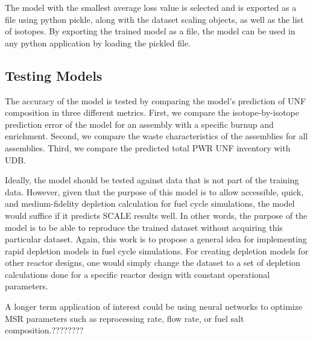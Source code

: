 The model with the smallest average loss value
is selected and is exported as a file using python
pickle, along with the dataset scaling objects, as well as
the list of isotopes. By exporting the trained model
as a file, the model can be used in any python
application by loading the pickled file.


\subsection{Testing Models}

The accuracy of the model is tested by comparing
the model's prediction of \gls{UNF} composition
in three different metrics. First, we compare the
isotope-by-isotope prediction error of the model for an
assembly with a specific burnup and enrichment.
Second, we compare the waste characteristics of
the assemblies for all assemblies. Third, we compare
the predicted total \gls{PWR} \gls{UNF} inventory with
\gls{UDB}.

Ideally, the model should be tested against data
that is not part of the training data. However, given
that the purpose of this model is to allow accessible,
quick, and medium-fidelity depletion calculation for
fuel cycle simulations, the model would suffice if
it predicts SCALE results well. In other words, the
purpose of the model is to be able to reproduce the
trained dataset without acquiring this particular dataset.
Again, this work
is to propose a general idea for implementing
rapid depletion models in fuel cycle simulations.
For creating depletion models for other reactor designs,
one would simply change the dataset to a set of depletion
calculations done for a specific reactor design with
constant operational parameters.

A longer term application of interest could be using
neural networks to optimize \gls{MSR} parameters
such as reprocessing rate, flow rate, or fuel
salt composition.????????
